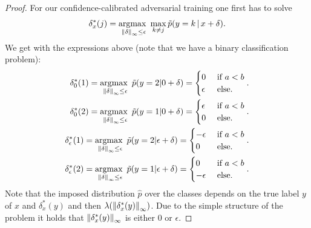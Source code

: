 \begin{proof}
    For our confidence-calibrated adversarial training one first has to solve
	\begin{align*}
		\delta_x^*(j)=\operatorname*{argmax~}_{\left\|\delta\right\|_\infty \leq \epsilon} \mathop{\rm max}\nolimits\limits_{k\neq j} \tilde{p}(y=k\,|\,x+\delta).
	\end{align*}
	We get with the expressions above (note that we have a binary classification problem):
    \begin{align*}
	    \delta^*_0(1)=\operatorname*{argmax~}_{\left\|\delta\right\|_\infty \leq \epsilon} \tilde{p}(y=2|{0}+\delta) = \begin{cases} 0 & \textrm{ if } a<b \\ \epsilon & \textrm{ else}.\end{cases}.\\
	    \delta^*_0(2)= \operatorname*{argmax~}_{\left\|\delta\right\|_\infty \leq \epsilon} \tilde{p}(y=1|{0} +\delta) = \begin{cases} \epsilon & \textrm{ if }  a<b  \\ 0 & \textrm{ else}.\end{cases}.\\
			\delta^*_\epsilon(1)= \operatorname*{argmax~}_{\left\|\delta\right\|_\infty \leq \epsilon} \tilde{p}(y=2|\epsilon+\delta) = \begin{cases} -\epsilon & \textrm{ if }  a<b  \\0 & \textrm{ else}.\end{cases}.\\
	    \delta^*_\epsilon(2)=\operatorname*{argmax~}_{\left\|\delta\right\|_\infty \leq \epsilon} \tilde{p}(y=1|\epsilon +\delta) = \begin{cases} 0 & \textrm{ if }  a<b  \\ -\epsilon & \textrm{ else}.\end{cases}.
    \end{align*}
    Note that the imposed distribution $\hat{p}$ over the classes depends on the true label $y$ of $x$ and $\delta^*_x(y)$ and then $\lambda(\left\|\delta^*_x(y)\right\|_\infty)$. Due to the simple structure of the problem it holds that $\left\|\delta^*_x(y)\right\|_\infty$ is either $0$ or $\epsilon$.
    

\end{proof}
